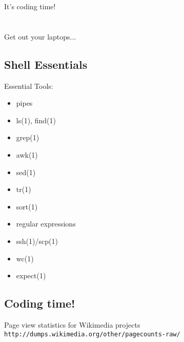 \documentclass[xga]{xdvislides}
\begin{document}
%
%

\newpage
\vspace*{\fill}
\begin{center}
    \Hugesize
        It's coding time! \\ [1em]
    \hspace*{5mm}
    \blueline\\
    \hspace*{5mm}\\
	Get out your laptops...
\end{center}
\vspace*{\fill}

\subsection{Shell Essentials}
Essential Tools:
\begin{itemize}
	\item pipes
	\item ls(1), find(1)
	\item grep(1)
	\item awk(1)
	\item sed(1)
	\item tr(1)
	\item sort(1)
	\item regular expressions
	\item ssh(1)/scp(1)
	\item wc(1)
	\item expect(1)
\end{itemize}

\subsection{Coding time!}
Page view statistics for Wikimedia projects \\
{\tt http://dumps.wikimedia.org/other/pagecounts-raw/} \\
\vspace{.5in}
\end{document}
